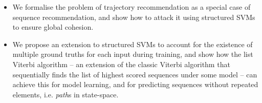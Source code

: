 \begin{itemize}[noitemsep,leftmargin=12pt]%
    \item We formalise the problem of trajectory recommendation as a special case of sequence recommendation,
          and show how to attack it using structured SVMs to ensure global cohesion.



    \item We propose an extension to structured SVMs to account for the existence of multiple ground truths for each input during training,
          and show how the list Viterbi algorithm -- an extension of the classic Viterbi algorithm that sequentially finds the list of highest scored sequences under some model -- can achieve this for model learning,
and for predicting sequences without repeated elements, i.e. {\em path}s in state-space.



\end{itemize}
